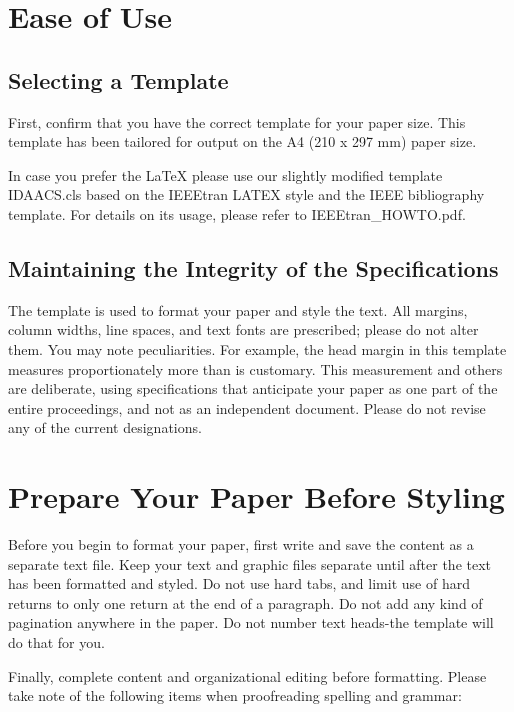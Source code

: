 \documentclass [a4paper,final,conference,10pt]{IDAACS}
\begin{document}
\section{Ease of Use}

\subsection{Selecting a Template}

First, confirm that you have the correct template for your paper size. This 
template has been tailored for output on the A4 (210 x 297 mm) paper size. 

In case you prefer the \LaTeX{} please use our slightly modified template 
IDAACS.cls based on the IEEEtran LATEX style and the IEEE bibliography 
template. For details on its usage, please refer to IEEEtran\_HOWTO.pdf.

\subsection{Maintaining the Integrity of the Specifications}

The template is used to format your paper and style the text. All margins,
column widths, line spaces, and text fonts are prescribed; please do not 
alter them. You may note peculiarities. For example, the head margin in 
this template measures proportionately more than is customary. This 
measurement and others are deliberate, using specifications that anticipate
your paper as one part of the entire proceedings, and not as an independent
document. Please do not revise any of the current designations.

\section{Prepare Your Paper Before Styling}

Before you begin to format your paper, first write and save the content as a 
separate text file. Keep your text and graphic files separate until after the
text has been formatted and styled. Do not use hard tabs, and limit use of 
hard returns to only one return at the end of a paragraph. Do not add any 
kind of pagination anywhere in the paper. Do not number text heads-the 
template will do that for you.

Finally, complete content and organizational editing before formatting. 
Please take note of the following items when proofreading spelling and 
grammar:
\end{document}
